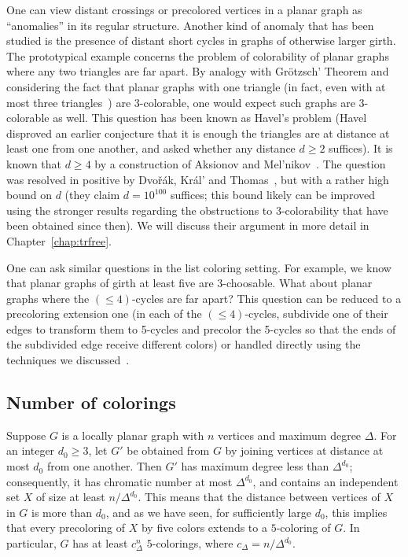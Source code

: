 \documentclass[12pt,twoside,openright,a4paper]{book}
\begin{document}
One can view distant crossings or precolored vertices in a planar graph as ``anomalies'' in its regular structure.
Another kind of anomaly that has been studied is the presence of distant short cycles in graphs of otherwise
larger girth.  The prototypical example concerns the problem of colorability of planar graphs where any two triangles
are far apart.  By analogy with Gr\"{o}tzsch' Theorem and considering the fact that planar graphs with one triangle
(in fact, even with at most three triangles~\cite{aksenov}) are 3-colorable, one would expect such graphs are 3-colorable
as well.  This question has been known as Havel's problem (Havel~\cite{conj-havel} disproved an earlier
conjecture that it is enough the triangles are at distance at least one from one another, and asked whether
any distance $d\ge 2$ suffices).  It is known that $d\ge 4$ by a construction of Aksionov and Mel'nikov~\cite{aksmel}.
The question was resolved in positive by Dvo\v{r}\'ak, Kr\'al' and Thomas~\cite{trfree5}, but with a rather
high bound on $d$ (they claim $d=10^{100}$ suffices; this bound likely can be improved using the stronger results
regarding the obstructions to 3-colorability that have been obtained since then).  We will discuss their
argument in more detail in Chapter~\ref{chap:trfree}.

One can ask similar questions in the list coloring setting.  For example, we know that planar graphs
of girth at least five are $3$-choosable.  What about planar graphs where the $(\le\!4)$-cycles are far apart?
This question can be reduced to a precoloring extension one (in each of the $(\le\!4)$-cycles, subdivide one
of their edges to transform them to 5-cycles and precolor the 5-cycles so that the ends of the subdivided
edge receive different colors) or handled directly using the techniques we discussed~\cite{le4far}.

\subsection{Number of colorings}

Suppose $G$ is a locally planar graph with $n$ vertices and maximum degree $\Delta$.
For an integer $d_0\ge 3$, let $G'$ be obtained from $G$ by joining vertices at distance at most $d_0$
from one another.  Then $G'$ has maximum degree less than $\Delta^{d_0}$; consequently,
it has chromatic number at most $\Delta^{d_0}$, and contains an independent set $X$ of size at least
$n/\Delta^{d_0}$.  This means that the distance between vertices of $X$ in $G$ is more than $d_0$,
and as we have seen, for sufficiently large $d_0$, this implies that every precoloring of $X$ by five colors
extends to a $5$-coloring of $G$.  In particular, $G$ has at least $c_\Delta^n$ $5$-colorings,
where $c_\Delta=n/\Delta^{d_0}$.
\end{document}
